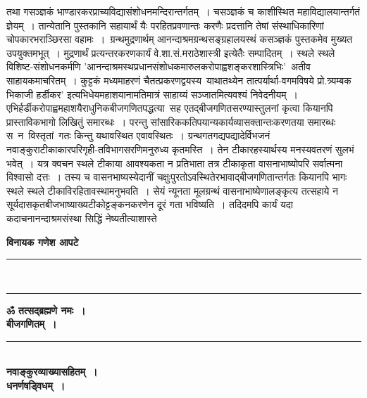 \documentclass[11pt, openany]{book}
\begin{document}
\newpage

\begin{sloppypar}
\noindent तथा गसञ्ज्ञकं भाण्डारकरप्राच्यविद्यासंशोधनमन्दिरान्तर्गतम्~। चसञ्ज्ञकं च काशीस्थित महाविद्यालयान्तर्गतं ज्ञेयम्~। तान्येतानि पुस्तकानि सहायार्थं यैः परहितप्रवणान्तः करणैः प्रदत्तानि तेषां संस्थाधिकारिणां चोपकारभराञ्छिरसा वहामः~।~ग्रन्थमुद्रणार्थम् आनन्दाश्रमग्रन्थसङ्ग्रहालयस्थं कसञ्ज्ञकं पुस्तकमेव मुख्यत उपयुक्तमभूत्~। मुद्रणार्थं प्रत्यन्तरकरणकार्यं वे.\;शा.\;सं.\;मराठेशास्त्री इत्येतैः सम्पादितम्~। स्थले स्थले विशिष्ट-संशोधनकर्मणि 'आनन्दाश्रमस्थप्रधानसंशोधकमारुलकरोपाह्वशङ्करशास्त्रिभिः'~अतीव साहायकमाचरितम्~। कुट्टकं मध्यमाहरणं चैतत्प्रकरणद्वयस्य~याथातथ्येन तात्पर्यार्था-वगमविषये प्रो.\;त्र्यम्बक भिकाजी हर्डीकर' इत्यभिधेयमहाशयानामतिमात्रं साहाय्यं सञ्जातमित्यवश्यं निवेदनीयम्~। एभिर्हर्डीकरोपाह्वमहाशयैराधुनिकबीजगणितपद्धत्या~सह एतद्बीजगणितसरण्यास्तुलनां कृत्वा कियानपि प्रास्ताविकभागो लिखितुं समारब्धः~। परन्तु सांसारिककतिपयान्यकार्यव्यासक्तान्तःकरणतया समारब्धः स~न~विस्तृतां~गतः किन्तु यथावस्थित एवावस्थितः~। ग्रन्थगतगद्यपद्यादेर्विभजनं नवाङ्कुराटीकाकारपरिगृही-तविभागसरणिमनुरुध्य कृतमस्ति~। तेन टीकारहस्यार्थस्य मनस्यवतरणं सुलभं भवेत्~। यत्र क्वचन स्थले टीकाया आवश्यकता न प्रतिभाता तत्र टीकाकृता वासनाभाष्योपरि सर्वात्मना विश्वासो दत्तः~। तस्य च वासनभाष्यस्येदानीं चक्षुःपुरतोऽवस्थितेरभावाद्बीजगणितान्तर्गतः कियानपि भागः स्थले स्थले टीकाविरहितावस्थामनुभवति~। सेयं न्यूनता मूलग्रन्थं वासनाभाष्येणालङ्कृत्य तत्सहाये न सूर्यदासकृतबीजभाष्याख्यटीकोट्टङ्कनकरणेन दूरं गता भविष्यति~। तदिदमपि कार्यं यदा कदाचनानन्दाश्रमसंस्था सिद्धिं नेष्यतीत्याशास्ते\textendash
\vspace{6mm}

\hspace{2mm} \textbf{\large विनायक गणेश आपटे}\\

\begin{center}
\rule{0.2\linewidth}{0.5pt}\\
\vspace{-4mm}

\rule{0.2\linewidth}{0.5pt}
\end{center}
\end{sloppypar}

\newpage
\thispagestyle{empty}

\begin{center}
\textbf{ॐ तत्सद्ब्रह्मणे नमः~।}\\
\vspace{5mm}
\textbf{\Huge बीजगणितम्~।}\\
\vspace{1mm}
\rule{0.3\linewidth}{0.5pt}\\
\vspace{5mm}
\textbf{\Large नवाङ्कुरव्याख्यासहितम्~।}\\
\vspace{8mm}
\textbf{\large धनर्णषड्विधम्~।}
\end{center}
\vspace{-1mm}
\end{document}
